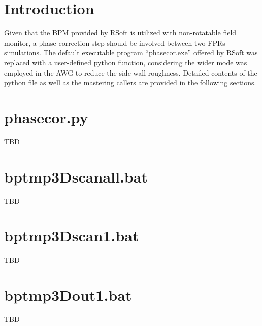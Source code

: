 
\section{Introduction}
    Given that the BPM provided by RSoft is utilized with non-rotatable field monitor, 
    a phase-correction step should be involved between two FPRs simulations. 
    The default executable program ``phasecor.exe'' offered by RSoft was replaced with 
    a user-defined python function, 
    considering the wider mode was employed in the AWG to reduce the side-wall roughness. 
    Detailed contents of the python file as well as the mastering callers are provided in the following sections.
\section{phasecor.py}
    TBD
\section{bptmp3Dscanall.bat}
    TBD
\section{bptmp3Dscan1.bat}
    TBD
\section{bptmp3Dout1.bat}
    TBD


